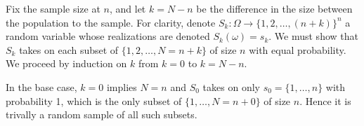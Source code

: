 \documentclass{homework}
\begin{document}
\begin{solution}
   Fix the sample size at $n$, and let $k=N-n$ be the difference in the size
   between the population to the sample.
   For clarity, denote $S_k:\Omega \to \{1,2,\dots,(n+k)\}^n$ a random variable whose realizations are denoted $S_k(\omega) = s_k$.  
   We must show that $S_k$ takes on each subset of $\{1,2,\dots,N=n+k\}$ of size $n$ with equal probability.  We proceed by induction on $k$ from
   $k=0$ to $k=N-n$.

   In the base case, $k=0$ implies $N=n$ and $S_0$ takes on only $s_0 =
   \{1,\dots,n\}$ with probability 1, which is the only subset of $\{1,\dots,N=n+0\}$ of size $n$. Hence it is trivally a
   random sample of all such subsets.


\end{solution}
\end{document}
